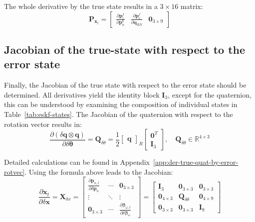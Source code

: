 The whole derivative by the true state results in a $3\times 16$ matrix:
\begin{equation}
    \mathbf{P}_{\mathbf{x}_t}=\begin{bmatrix}
     \frac{\partial\mathbf{p}_c^f}{\partial\mathbf{p}_n^b} & \frac{\partial\mathbf{p}_c^f}{\partial\mathbf{q}_{BN}} & \mathbf{0}_{3\times 9}
    \end{bmatrix}
\end{equation}

\subsection*{Jacobian of the true-state with respect to the error state}

Finally, the Jacobian of the true state with respect to the error state should be determined. All derivatives yield the identity block $\mathbf{I}_3$, except for the quaternion, this can be understood by examining the composition of individual states in Table~\ref{tab:eskf-states}. The Jacobian of the quaternion with respect to the rotation vector results in:
\begin{equation}
    \frac{\partial(\delta\mathbf{q}\otimes \mathbf{q})}{\partial\delta\boldsymbol{\theta}} = \mathbf{Q}_{\delta\theta} = \frac{1}{2}\begin{bmatrix}
        \mathbf{q}
    \end{bmatrix}_R
    \begin{bmatrix}
        \mathbf{0}^T \\
        \mathbf{I}_3
    \end{bmatrix}, \quad \mathbf{Q}_{\delta\theta}\in\mathbb{R}^{4\times 3}
\end{equation}

Detailed calculations can be found in Appendix~\ref{app:der-true-quat-by-error-rotvec}. Using the formula above leads to the Jacobian:
\begin{equation}
    \frac{\partial\mathbf{x}_t}{\partial\delta\mathbf{x}} = \mathbf{X}_{\delta x}=\begin{bmatrix}
        \frac{\partial\mathbf{p}_{n,t}}{\partial\delta\mathbf{p}_n} & \cdots & \mathbf{0}_{3\times 3} \\ \vdots & \ddots & \vdots \\
        \mathbf{0}_{3\times 3} & \cdots & \frac{\partial\boldsymbol{\beta}_{\omega, t}}{\partial\delta\boldsymbol{\beta}_{\omega}}
    \end{bmatrix} = \begin{bmatrix}
        \mathbf{I}_3 & \mathbf{0}_{3\times 3} & \mathbf{0}_{3\times 3} \\
        \mathbf{0}_{4\times 3} & \mathbf{Q}_{\delta\theta} & \mathbf{0}_{4\times 9} \\
        \mathbf{0}_{3\times 3} & \mathbf{0}_{3\times 3} & \mathbf{I}_{9}
    \end{bmatrix}
\end{equation}

